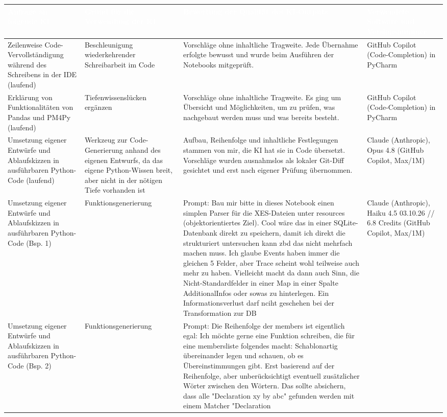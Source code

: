 \begin{landscape}
\begin{longtable}{|p{6.5cm}|p{5cm}|p{8cm}|p{4cm}|}
\hline
\rowcolor{color_30879}
\textbf{\textcolor{white}{Anfrage an folgende KI}} &
\textbf{\textcolor{white}{Grund für die Verwendung der KI}} &
\textbf{\textcolor{white}{Bewertung der Qualität des KI-Outputs}} &
\textbf{\textcolor{white}{Verwendete Software und Versionsnummer}} \\
\hline
\endhead
\hline
Zeilenweise Code-Vervollständigung während des Schreibens in der IDE (laufend) &
Beschleunigung wiederkehrender Schreibarbeit im Code &
Vorschläge ohne inhaltliche Tragweite. Jede Übernahme erfolgte bewusst und wurde beim Ausführen der Notebooks mitgeprüft. &
GitHub Copilot (Code-Completion) in PyCharm \\
\hline
Erklärung von Funktionalitäten von Pandas und PM4Py (laufend) &
Tiefenwissenslücken ergänzen &
Vorschläge ohne inhaltliche Tragweite. Es ging um Übersicht und Möglichkeiten, um zu prüfen, was nachgebaut werden muss und was bereits besteht. &
GitHub Copilot (Code-Completion) in PyCharm \\
\hline
Umsetzung eigener Entwürfe und Ablaufskizzen in ausführbaren Python-Code (laufend) &
Werkzeug zur Code-Generierung anhand des eigenen Entwurfs, da das eigene Python-Wissen breit, aber nicht in der nötigen Tiefe vorhanden ist &
Aufbau, Reihenfolge und inhaltliche Festlegungen stammen von mir, die KI hat sie in Code übersetzt. Vorschläge wurden ausnahmslos als lokaler Git-Diff gesichtet und erst nach eigener Prüfung übernommen. &
Claude (Anthropic), Opus 4.8 (GitHub Copilot, Max/1M) \\
\hline
Umsetzung eigener Entwürfe und Ablaufskizzen in ausführbaren Python-Code (Bsp. 1) &
Funktionsgenerierung &
Prompt: Bau mir bitte in dieses Notebook einen simplen Parser für die XES-Dateien unter resources (objektorientiertes Ziel). Cool wäre das in einer SQLite-Datenbank direkt zu speichern, damit ich direkt die strukturiert untersuchen kann zbd das nicht mehrfach machen muss. Ich glaube Events haben immer die gleichen 5 Felder, aber Trace scheint wohl teilweise auch mehr zu haben. Vielleicht macht da dann auch Sinn, die Nicht-Standardfelder in einer Map in einer Spalte AdditionalInfos oder sowas zu hinterlegen. Ein Informationsverlust darf nciht geschehen bei der Transformation zur DB &
Claude (Anthropic), Haiku 4.5 03.10.26 // 6.8 Credits (GitHub Copilot, Max/1M) \\
\hline
Umsetzung eigener Entwürfe und Ablaufskizzen in ausführbaren Python-Code (Bsp. 2) &
Funktionsgenerierung &
Prompt: Die Reihenfolge der members ist eigentlich egal: Ich möchte gerne eine Funktion schreiben, die für eine membersliste folgendes macht: Schablonartig übereinander legen und schauen, ob es Übereinstimmungen gibt. Erst basierend auf der Reihenfolge, aber unberücksichtigt eventuell zusätzlicher Wörter zwischen den Wörtern. Das sollte absichern, dass alle "Declaration xy by abc" gefunden werden mit einem Matcher "Declaration %

\end{longtable}
\end{landscape}
